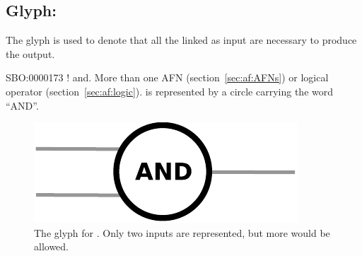 \subsection{Glyph: }
\label{sec:af:and}

The glyph  is used to denote that all the  linked as input are necessary to produce the output.

\begin{glyphDescription}
 \glyphSboTerm SBO:0000173 ! and.
 \glyphOrigin More than one AFN (section~\ref{sec:af:AFNs}) or logical operator (section~\ref{sec:af:logic}).
 \glyphTarget  
 \glyphNode {} is represented by a circle carrying the word ``AND''.
\end{glyphDescription}

\begin{figure}[H]
  \centering
  \includegraphics[scale = 0.5]{images/and}
  \caption{The \AF glyph for . Only two inputs are represented, but more would be allowed.}
  \label{fig:af:and}
\end{figure}
